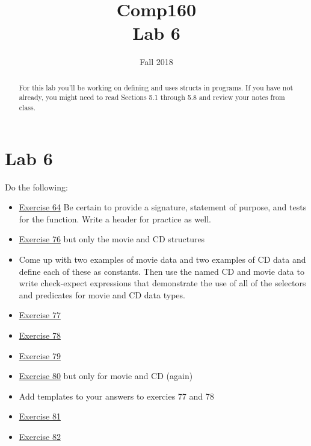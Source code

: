\documentclass[nobib]{tufte-handout}
\title{Comp160 \\ Lab 6 }
\author{}
\date{ Fall 2018 }
\begin{document}
\maketitle

\begin{abstract}
For this lab you'll be working on defining and uses structs in programs.  If you have not already, you might need to read Sections 5.1 through 5.8 and review your notes from class.
\end{abstract}

\section*{Lab 6}

Do the following:
\begin{itemize}
  \item \href{https://htdp.org/2018-01-06/Book/part_one.html#%28counter._%28exercise._struct2%29%29}{Exercise 64} Be certain to provide a signature, statement of purpose, and tests for the function.  Write a header for practice as well.
  \item \href{https://htdp.org/2018-01-06/Book/part_one.html#%28counter._data-uni._%28exercise._struct7%29%29}{Exercise 76} but only the movie and CD structures
  \item Come up with two examples of movie data and two examples of CD data and define each of these as constants. Then use the named CD and movie data to write check-expect expressions that demonstrate the use of all of the selectors and predicates for movie and CD data types. 
  \item \href{https://htdp.org/2018-01-06/Book/part_one.html#%28counter._data-uni._%28exercise._ex~3atime-structure%29%29}{Exercise 77}
  \item \href{https://htdp.org/2018-01-06/Book/part_one.html#%28counter._data-uni._%28exercise._struct9%29%29}{Exercise 78}
  \item \href{https://htdp.org/2018-01-06/Book/part_one.html#%28counter._data-uni._%28exercise._struct10%29%29}{Exercise 79}
  \item \href{https://htdp.org/2018-01-06/Book/part_one.html#%28counter._%28exercise._struct11%29%29}{Exercise 80} but only for movie and CD (again)
  \item Add templates to your answers to exercies 77 and 78
  \item \href{https://htdp.org/2018-01-06/Book/part_one.html#%28counter._%28exercise._struct11a%29%29}{Exercise 81}
  \item \href{https://htdp.org/2018-01-06/Book/part_one.html#%28counter._%28exercise._struct11b%29%29}{Exercise 82}
\end{itemize}
\end{document}
